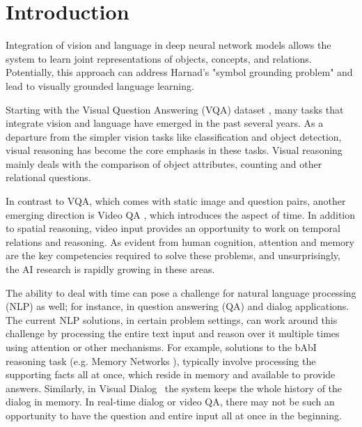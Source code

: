 \section{Introduction}

Integration of vision and language in deep neural network models allows the system to learn joint representations of objects, concepts, and relations.  Potentially, this approach can address Harnad's "symbol grounding problem" \cite{harnad2003symbol} and lead to visually grounded language learning.

Starting with the Visual Question Answering (VQA) dataset \cite{}, many tasks that integrate vision and language have emerged in the past several years\cite{mogadala2019trends}.  As a departure from the simpler vision tasks like classification and object detection, visual reasoning has become the core emphasis in these tasks. Visual reasoning mainly deals with the comparison of object attributes, counting and other relational questions.

In contrast to VQA, which comes with static image and question pairs, another emerging direction is Video QA \cite{}, which introduces the aspect of time.  In addition to spatial reasoning, video input provides an opportunity to work on temporal relations and reasoning.  As evident from human cognition, attention and memory are the key competencies required to solve these problems, and unsurprisingly, the AI research is rapidly growing in these areas.

The ability to deal with time can pose a challenge for natural language processing (NLP) as well; for instance, in question answering (QA) and dialog applications.  The current NLP solutions, in certain problem settings, can work around this challenge by processing the entire text input and reason over it multiple times using attention \cite{vaswani2017attention} or other mechanisms. For example, solutions to the bAbI reasoning task (e.g. Memory Networks \cite{weston2015towards}), typically involve processing the supporting facts all at once, which reside in memory and available to provide answers. Similarly, in Visual Dialog~\cite{das2017visual} the system keeps the whole history of the dialog in memory.  In real-time dialog or video QA, there may not be such an opportunity to have the question and entire input all at once in the beginning.  

